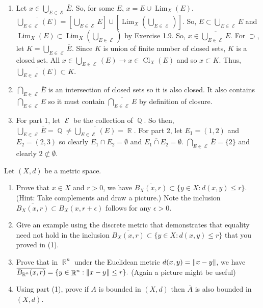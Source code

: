 \documentclass[12pt,letterpaper,boxed]{hmcpset}
\DeclareMathOperator{\Lim}{Lim}
\DeclareMathOperator{\Cl}{Cl}
\DeclareMathOperator{\R}{\mathbb{R}}
\DeclareMathOperator{\Q}{\mathbb{Q}}
\DeclareMathOperator{\bigep}{\mathcal{E}}
\DeclarePairedDelimiter{\norm}{\lVert}{\rVert}
\begin{document}
\begin{solution}
\vspace{-2mm}
	\begin{enumerate}
		\itemsep0em
		\item Let $x \in \bigcup_{E \in \bigep} \overline{E}.$ So, for some $E$, $x = E \cup \Lim_X(E).$ $\overline{\bigcup_{E\in\bigep}(E)} = [\bigcup_{E \in \bigep}E]\cup[\Lim_X(\bigcup_{E \in \bigep})].$ So, $E \subset \bigcup_{E \in \bigep}E$ and $\Lim_X (E) \subset \Lim_X(\bigcup_{E \in \bigep})$ by Exercise 1.9. So, $x \in \overline{\bigcup_{E\in\bigep} E}.$ For $\supset$, let $K = \bigcup_{E\in\bigep} \overline{E}.$ Since $K$ is union of finite number of closed sets, $K$ is a closed set. All $x\in \bigcup_{E \in \bigep}(E) \rightarrow x \in \Cl_X(E)$ and so $x \subset K.$ Thus, $\overline{\bigcup_{E \in \bigep}(E)} \subset K.$ 
		\item $\bigcap_{E \in \bigep}\overline{E}$ is an intersection of closed sets so it is also closed. It also contains $\bigcap_{E\in \bigep}E$ so it must contain $\overline{\bigcap_{E \in \bigep} E}$ by definition of closure.
		\item For part 1, let $\bigep$ be the collection of $\Q$. So then, $\bigcup_{E \in \bigep} \overline{E} = \Q \neq \overline{\bigcup_{E \in \bigep}(E)}=\R.$ For part 2, let $E_1 = (1,2)$ and $E_2 = (2, 3)$ so clearly $E_1\cap E_2 = \emptyset$ and $\overline{E_1\cap E_2}=\emptyset$. $\bigcap_{E \in \bigep} \overline{E} = \{2\}$ and clearly $2 \not\subset \emptyset.$
	\end{enumerate}
\end{solution}

\begin{problem}[Exercise 1.28]
Let $(X, d)$ be a metric space.
	\vspace{-2mm}
	\begin{enumerate}
		\itemsep0em
		\item Prove that $x\in X$ and $r > 0$, we have $\overline{B_X(x,r)}\subset \{y \in X : d(x,y) \leq r\}.$ (Hint: Take complements and draw a picture.) Note the inclusion $\overline{B_X(x,r)}\subset B_X(x, r + \epsilon)$ follows for any $\epsilon > 0.$
		\item Give an example using the discrete metric that demonstrates that equality need not hold in the inclusion $\overline{B_X(x,r)}\subset \{y \in X : d(x,y) \leq r\}$ that you proved in (1).
		\item Prove that in $\R^{n}$ under the Euclidean metric $d(x, y) = \norm{x - y}$, we have $\overline{B_{\R^{n}}(x,r)} = \{y \in \R^{n} : \norm{x - y} \leq r\}.$ (Again a picture might be useful)
		\item Using part (1), prove if $A$ is bounded in $(X, d)$ then $\overline{A}$ is also bounded in $(X,d)$.
	\end{enumerate}
\end{problem}
\end{document}
